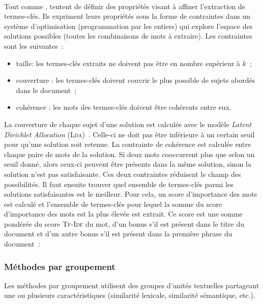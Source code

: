        \label{subsubsec:main-state_of_the_art-automatic_keyphrase_extraction-unsupervised_keyphrase_extraction-statistical_approaches:ilp}
        ~\\Tout comme ,
         tentent de définir des
        propriétés visant à affiner l'extraction de termes-clés. Ils expriment leurs propriétés sous
        la forme de contraintes dans un système d'optimisation (programmation
        par les entiers) qui explore l'espace des solutions possibles (toutes
        les combinaisons de mots à extraire). Les contraintes sont les
        suivantes~:
        \begin{itemize}
          \item{taille: les termes-clés extraits ne doivent pas être en nombre
                supérieur à $k$~;}
          \item{couverture : les termes-clés doivent couvrir le plus possible de
                sujets abordés dans le document~;}
          \item{cohérence : les mots des termes-clés doivent être cohérents
                entre eux.}
        \end{itemize}
        La couverture de chaque sujet d'une solution est calculée avec le modèle
        \textit{Latent Dirichlet Allocation} (\textsc{Lda})~\cite{blei2003lda}.
        Celle-ci ne doit pas être inférieure à un certain seuil pour qu'une
        solution soit retenue. La contrainte de cohérence est calculée entre
        chaque paire de mots de la solution. Si deux mots cooccurrent plus que
        selon un seuil donné, alors ceux-ci peuvent être présents dans la même
        solution, sinon la solution n'est pas satisfaisante. Ces deux
        contraintes réduisent le champ des possibilités. Il faut ensuite
        trouver quel ensemble de termes-clés parmi les solutions satisfaisantes
        est le meilleur. Pour cela, un score d'importance des mots est calculé
        et l'ensemble de termes-clés pour lequel la somme du score d'importance
        des mots est la plus élevée est extrait. Ce score est une somme pondérée
        du score \textsc{Tf-Idf} du mot, d'un bonus s'il est présent dans le
        titre du document et d'un autre bonus s'il est présent dans la première
        phrase du document~:

      \subsubsection{Méthodes par groupement}
      \label{subsubsec:main-state_of_the_art-automatic_keyphrase_extraction-unsupervised_keyphrase_extraction-clustering_approaches}
        Les méthodes par groupement utilisent des groupes d'unités textuelles
        partageant une ou plusieurs caractéristiques (similarité lexicale,
        similarité sémantique, etc.).

